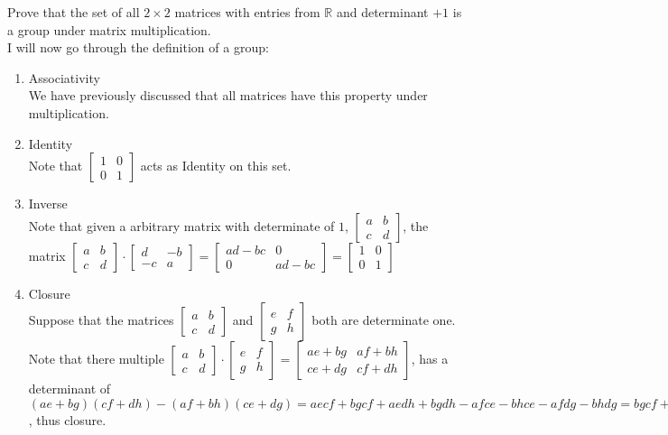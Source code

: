 \documentclass[12pt]{article}
\makeatletter
\theoremstyle{homework}
\newenvironment{exercise}[1]
{\def\@currentlabel{#1}\exercisecore}
{\endexercisecore}
\makeatother
\begin{document}
\begin{exercise}
{2.19}
Prove that the set of all $2 \times 2$ matrices with entries from $\mathbb{R}$ and determinant $+1$ is a group under matrix multiplication.\\
I will now go through the definition of a group:
\begin{enumerate}[(1)]
\item
Associativity\\
We have previously discussed that all matrices have this property under multiplication.
\item
Identity\\
Note that $\begin{bmatrix}
1&0\\
0&1
\end{bmatrix}$ acts as Identity on this set.
\item
Inverse\\
Note that given a arbitrary matrix with determinate of $1$, $\begin{bmatrix}
a&b\\ c&d
\end{bmatrix}$, the matrix $\begin{bmatrix}
a&b\\ c&d
\end{bmatrix}\cdot \begin{bmatrix}
d&-b\\ -c&a
\end{bmatrix}=\begin{bmatrix}
ad-bc&0\\ 0&ad-bc
\end{bmatrix}=\begin{bmatrix}
1&0\\ 0&1
\end{bmatrix}$
\item
Closure\\
Suppose that the matrices $\begin{bmatrix}
a&b\\ c&d
\end{bmatrix}$ and $\begin{bmatrix}
e&f\\ g&h
\end{bmatrix}$ both are determinate one.  Note that there multiple $\begin{bmatrix}
a&b\\ c&d
\end{bmatrix}\cdot \begin{bmatrix}
e&f\\ g&h
\end{bmatrix}=\begin{bmatrix}
ae+bg & af+bh\\ ce+dg & cf+dh
\end{bmatrix}$, has a determinant of $(ae+bg)(cf+dh)-(af+bh)(ce+dg)=aecf+bgcf+aedh+bgdh-afce-bhce-afdg-bhdg=bgcf+aedh-bhce-afdg=bc(gf-he)+ad(eh-fg)=bc(-1)+ad(1)=1$, thus closure.

\end{enumerate}
\end{exercise}
\end{document}
